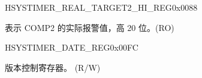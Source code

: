 \begin{register}{H}{SYSTIMER\_REAL\_TARGET2\_HI\_REG}{0x0088}\label{regdesc:SYSTIMERREALTARGET2HIREG}
%
%
\regnewline%
\begin{regdesc}\begin{reglist}
\label{fielddesc:SYSTIMERTARGET2HIRO}\item [SYSTIMER\_TARGET2\_HI\_RO] 表示 COMP2 的实际报警值，高 20 位。(RO)
\end{reglist}\end{regdesc}
\end{register}


\begin{register}{H}{SYSTIMER\_DATE\_REG}{0x00FC}\label{regdesc:SYSTIMERDATEREG}
%
%
%
\regnewline%
\begin{regdesc}\begin{reglist}
\label{fielddesc:SYSTIMERDATE}\item [SYSTIMER\_DATE] 版本控制寄存器。 (R/W)
\end{reglist}\end{regdesc}
\end{register}


